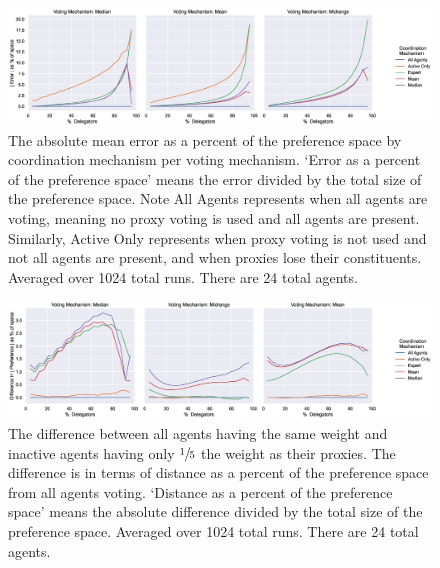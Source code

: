 \begin{landscape}
    \begin{figure}[p]
        \centering
        \includegraphics[scale=0.55]
        {content/chapter2/figures/vm_col_cm_hue_error_as_percent_of_space_abs_mean}
        \caption{
            The absolute mean error as a percent of the preference space by
            coordination mechanism per voting mechanism.
            `Error as a percent of the preference space' means the error divided by
            the total size of the preference space.
            Note All Agents represents when all agents are voting, meaning no proxy
            voting is used and all agents are present.
            Similarly, Active Only represents when proxy voting is not used and not
            all agents are present, and when proxies lose their constituents.
            Averaged over 1024 total runs.
            There are 24 total agents.
        }
        \label{fig:vm-col-cm-hue-error-as-percent-of-space-abs-mean}
    \end{figure}

    \begin{figure}[p]
        \centering
        \includegraphics[scale=0.55]
        {content/chapter2/figures/different_weight/difference_abs_pref_percent_of_space_smoothed}
        \caption{
            The difference between all agents having the same weight and inactive agents
            having only $\sfrac{1}{5}$ the weight as their proxies.
            The difference is in terms of distance as a percent of the preference
            space from all agents voting.
            `Distance as a percent of the preference space' means the absolute
            difference divided by the total size of the preference space.
            Averaged over 1024 total runs.
            There are 24 total agents.
        }
        \label{fig:different-weight-comparison}
    \end{figure}
\end{landscape}

